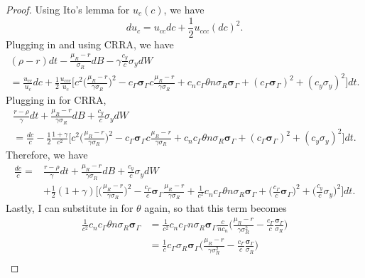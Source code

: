 \documentclass[11pt]{extarticle}
\theoremstyle{plain}
\theoremstyle{definition}
\begin{document}
\begin{enumerate}[(a)]
\begin{proof}
	
	Using Ito's lemma for $u_c(c)$, we have 
	\begin{equation*}
		du_c = u_{cc} dc + \frac{1}{2} u_{ccc} (dc)^2. 
	\end{equation*}
	Plugging in and using CRRA, we have 
	\begin{gather*}
		(\rho - r) dt -  \frac{\mu_R - r}{\sigma_R} dB  - \gamma \frac{c_y}{c} \sigma_y dW \\
		= \frac{u_{cc}}{u_c} dc + \frac{1}{2} \frac{u_{ccc}}{u_c} \bigg[ c^2 \bigg( \frac{\mu_R - r}{\gamma \sigma_R} \bigg)^2  - c_\Gamma  \bm \sigma_\Gamma  c \frac{\mu_R - r}{\gamma \sigma_R} + c_n c_\Gamma \theta n \sigma_R \bm \sigma_\Gamma + (c_\Gamma \bm \sigma_\Gamma)^2 + (c_y \sigma_y)^2 \bigg] dt.
	\end{gather*}
	Plugging in for CRRA, 
	\begin{gather*}
		\frac{r - \rho}{\gamma} dt +  \frac{\mu_R - r}{\gamma \sigma_R} dB  + \frac{c_y}{c} \sigma_y dW \\
		= \frac{dc}{c} - \frac{1}{2} \frac{1+\gamma}{c^2} \bigg[ c^2 \bigg( \frac{\mu_R - r}{\gamma \sigma_R} \bigg)^2  - c_\Gamma  \bm \sigma_\Gamma  c \frac{\mu_R - r}{\gamma \sigma_R} + c_n c_\Gamma \theta n \sigma_R \bm \sigma_\Gamma + (c_\Gamma \bm \sigma_\Gamma)^2 + (c_y \sigma_y)^2 \bigg] dt.
	\end{gather*}	
	Therefore, we have 
	\begin{align*}
		\frac{dc}{c} = & \frac{r - \rho}{\gamma} dt +  \frac{\mu_R - r}{\gamma \sigma_R} dB  + \frac{c_y}{c} \sigma_y dW \\
		&+ \frac{1}{2} (1+\gamma) \bigg[ \bigg( \frac{\mu_R - r}{\gamma \sigma_R} \bigg)^2  - \frac{c_\Gamma }{c} \bm \sigma_\Gamma \frac{\mu_R - r}{\gamma \sigma_R} + \frac{1}{c^2} c_n c_\Gamma \theta n \sigma_R \bm \sigma_\Gamma + \bigg( \frac{c_\Gamma}{c} \bm \sigma_\Gamma \bigg)^2 + \bigg( \frac{c_y}{c} \sigma_y \bigg)^2 \bigg] dt.
	\end{align*}
	Lastly, I can substitute in for $\theta$ again, so that this term becomes 
	\begin{align*}
		\frac{1}{c^2} c_n c_\Gamma \theta n \sigma_R \bm \sigma_\Gamma &= \frac{1}{c^2} c_n c_\Gamma n \sigma_R \bm \sigma_\Gamma \frac{c}{n c_n} \bigg( \frac{\mu_R - r}{\gamma \sigma_R^2 } - \frac{c_\Gamma}{c} \frac{ \bm \sigma_\Gamma }{\sigma_R} \bigg) \\
		&= \frac{1}{c} c_\Gamma \sigma_R \bm \sigma_\Gamma \bigg( \frac{\mu_R - r}{\gamma \sigma_R^2 } - \frac{c_\Gamma}{c} \frac{ \bm \sigma_\Gamma }{\sigma_R} \bigg) \\

\end{align*}
\end{proof}
\end{enumerate}
\end{document}
